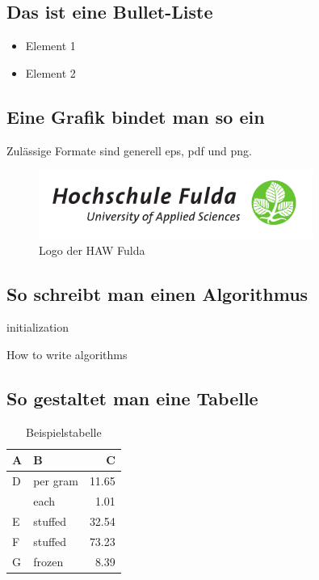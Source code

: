 \documentclass[12pt,oneside]{article}
\begin{document}
\subsection{Das ist eine Bullet-Liste}
\begin{itemize}
\item Element 1
\item Element 2
\end{itemize}


\subsection{Eine Grafik bindet man so ein}
Zulässige Formate sind generell eps, pdf und png.
\begin{figure}[h]
    \centering
    \includegraphics[width=0.8\textwidth]{logo.pdf}
    \caption{Logo der HAW Fulda}
    \label{fig:bildchen}
\end{figure}

\subsection{So schreibt man einen Algorithmus}

\begin{algorithm}[H]
 initialization\;
 \caption{How to write algorithms\label{alg:dummy}
 }
\end{algorithm}

\subsection{So gestaltet man eine Tabelle}

\begin{table}[H]
\caption{Beispielstabelle\label{tab:beispiel}
}
\centering
\begin{tabular}{llr}
\hline
A    & B & C \\
\hline
D      & per gram    & 11.65      \\
          & each        & 1.01       \\
E       & stuffed     & 32.54      \\
F       & stuffed     & 73.23      \\
G & frozen      & 8.39       \\
\hline
\end{tabular}
\end{table}
\end{document}
